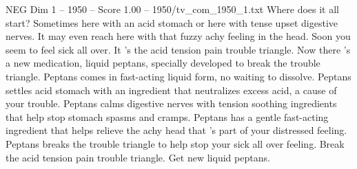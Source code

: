 \begin{textsample}{NEG Dim 1 – 1950 – Score 1.00 – 1950/tv\_com\_1950\_1.txt}  \label{ex:f1_neg_084}
Where does it all start?
Sometimes here with an acid stomach or here with tense upset digestive nerves.
It may even reach here with that fuzzy achy feeling in the head.
Soon you seem to feel sick all over.
It 's the acid tension pain trouble triangle.
Now there 's a new medication, liquid peptans, specially developed to break the trouble triangle.
Peptans comes in fast-acting liquid form, no waiting to dissolve.
Peptans settles acid stomach with an ingredient that neutralizes excess acid, a cause of your trouble.
Peptans calms digestive nerves with tension soothing ingredients that help stop stomach spasms and cramps.
Peptans has a gentle fast-acting ingredient that helps relieve the achy head that 's part of your distressed feeling.
Peptans breaks the trouble triangle to help stop your sick all over feeling.
Break the acid tension pain trouble triangle.
Get new liquid peptans.

\end{textsample}

